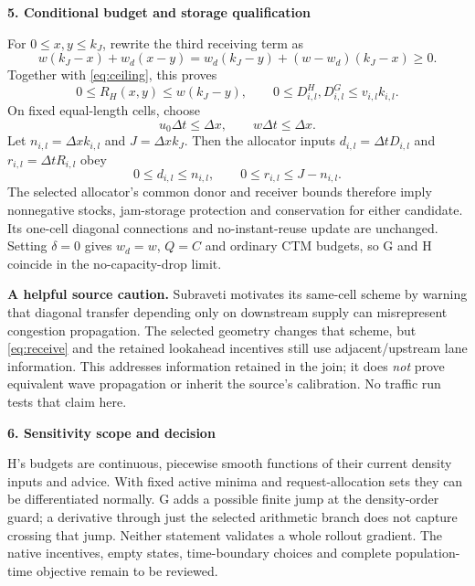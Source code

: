 \documentclass[10pt,a4paper]{article}
\newcommand{\head}[1]{\par\medskip\textbf{#1}\par}
\begin{document}
\newpage
\head{5. Conditional budget and storage qualification}
For $0\leq x,y\leq k_J$, rewrite the third receiving term as
\begin{equation}
 w(k_J-x)+w_d(x-y)
 =w_d(k_J-y)+(w-w_d)(k_J-x)\geq0. \label{eq:positive}
\end{equation}
Together with \eqref{eq:ceiling}, this proves
\begin{equation}
 0\leq R_H(x,y)\leq w(k_J-y),\qquad
 0\leq D^H_{i,l},D^G_{i,l}\leq v_{i,l}k_{i,l}. \label{eq:bounds}
\end{equation}
On fixed equal-length cells, choose
\begin{equation}
 u_0\Delta t\leq\Delta x,\qquad w\Delta t\leq\Delta x.
\end{equation}
Let $n_{i,l}=\Delta x k_{i,l}$ and $J=\Delta x k_J$. Then the allocator
inputs $d_{i,l}=\Delta t D_{i,l}$ and $r_{i,l}=\Delta t R_{i,l}$ obey
\begin{equation}
 0\leq d_{i,l}\leq n_{i,l},\qquad
 0\leq r_{i,l}\leq J-n_{i,l}.
\end{equation}
The selected allocator's common donor and receiver bounds therefore imply
nonnegative stocks, jam-storage protection and conservation for either
candidate. Its one-cell diagonal connections and no-instant-reuse update
are unchanged. Setting $\delta=0$ gives $w_d=w$, $Q=C$ and ordinary CTM
budgets, so G and H coincide in the no-capacity-drop limit.

\textbf{A helpful source caution.} Subraveti motivates its same-cell scheme
by warning that diagonal transfer depending only on downstream supply can
misrepresent congestion propagation. The selected geometry changes that
scheme, but \eqref{eq:receive} and the retained lookahead incentives still
use adjacent/upstream lane information. This addresses information retained
in the join; it does \emph{not} prove equivalent wave propagation or inherit
the source's calibration. No traffic run tests that claim here.

\head{6. Sensitivity scope and decision}
H's budgets are continuous, piecewise smooth functions of their current
density inputs and advice. With fixed active minima and request-allocation
sets they can be differentiated normally. G adds a possible finite jump at
the density-order guard; a derivative through just the selected arithmetic
branch does not capture crossing that jump. Neither statement validates a
whole rollout gradient. The native incentives, empty states, time-boundary
choices and complete population-time objective remain to be reviewed.
\end{document}
